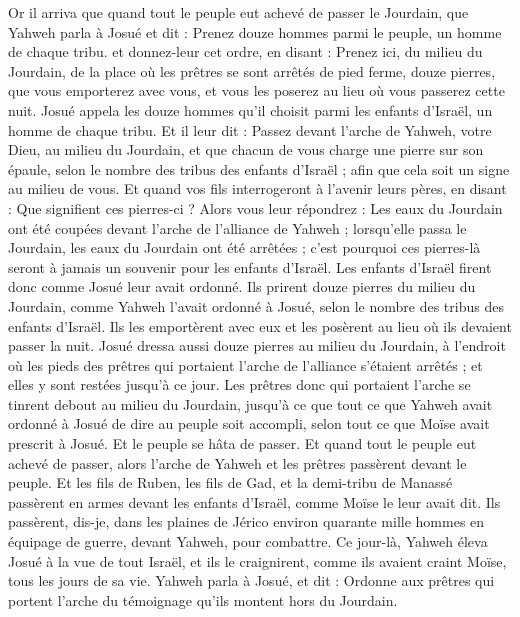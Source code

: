 \begin{multicols}{2}
\VerseOne{}Or il arriva que quand tout le peuple eut achevé de passer le Jourdain, que Yahweh parla à Josué et dit :
Prenez douze hommes parmi le peuple, un homme de chaque tribu.
et donnez-leur cet ordre, en disant : Prenez ici, du milieu du Jourdain, de la place où les prêtres se sont arrêtés de pied ferme, douze pierres, que vous emporterez avec vous, et vous les poserez au lieu où vous passerez cette nuit.
Josué appela les douze hommes qu'il choisit parmi les enfants d'Israël, un homme de chaque tribu.
Et il leur dit : Passez devant l'arche de Yahweh, votre Dieu, au milieu du Jourdain, et que chacun de vous charge une pierre sur son épaule, selon le nombre des tribus des enfants d'Israël ;
afin que cela soit un signe au milieu de vous. Et quand vos fils interrogeront à l'avenir leurs pères, en disant : Que signifient ces pierres-ci ?
Alors vous leur répondrez : Les eaux du Jourdain ont été coupées devant l'arche de l'alliance de Yahweh ; lorsqu'elle passa le Jourdain, les eaux du Jourdain ont été arrêtées ; c'est pourquoi ces pierres-là seront à jamais un souvenir pour les enfants d'Israël.
Les enfants d'Israël firent donc comme Josué leur avait ordonné. Ils prirent douze pierres du milieu du Jourdain, comme Yahweh l'avait ordonné à Josué, selon le nombre des tribus des enfants d'Israël. Ils les emportèrent avec eux et les posèrent au lieu où ils devaient passer la nuit.
Josué dressa aussi douze pierres au milieu du Jourdain, à l'endroit où les pieds des prêtres qui portaient l'arche de l'alliance s'étaient arrêtés ; et elles y sont restées jusqu'à ce jour.
Les prêtres donc qui portaient l'arche se tinrent debout au milieu du Jourdain, jusqu'à ce que tout ce que Yahweh avait ordonné à Josué de dire au peuple soit accompli, selon tout ce que Moïse avait prescrit à Josué. Et le peuple se hâta de passer.
Et quand tout le peuple eut achevé de passer, alors l'arche de Yahweh et les prêtres passèrent devant le peuple.
Et les fils de Ruben, les fils de Gad, et la demi-tribu de Manassé passèrent en armes devant les enfants d'Israël, comme Moïse le leur avait dit.
Ils passèrent, dis-je, dans les plaines de Jérico environ quarante mille hommes en équipage de guerre, devant Yahweh, pour combattre. 
Ce jour-là, Yahweh éleva Josué à la vue de tout Israël, et ils le craignirent, comme ils avaient craint Moïse, tous les jours de sa vie.
Yahweh parla à Josué, et dit :
Ordonne aux prêtres qui portent l'arche du témoignage qu'ils montent hors du Jourdain.

\end{multicols}

